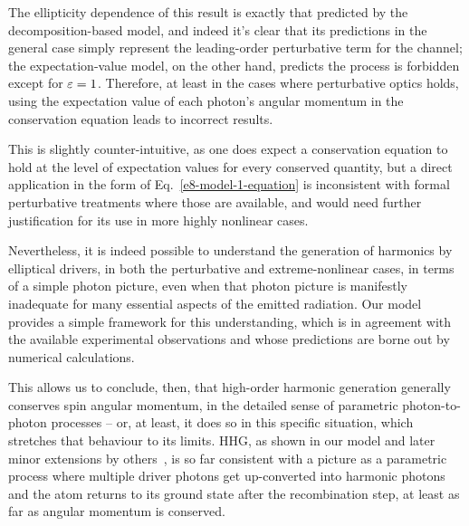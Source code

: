 The ellipticity dependence of this result is exactly that predicted by the decomposition-based model, and indeed it's clear that its predictions in the general case simply represent the leading-order perturbative term for the channel; the expectation-value model, on the other hand, predicts the process is forbidden except for $\varepsilon=1$. Therefore, at least in the cases where perturbative optics holds, using the expectation value of each photon's angular momentum in the conservation equation leads to incorrect results. 

This is slightly counter-intuitive, as one does expect a conservation equation to hold at the level of expectation values for every conserved quantity, but a direct application in the form of Eq.~\eqref{e8-model-1-equation} is inconsistent with formal perturbative treatments where those are available, and would need further justification for its use in more highly nonlinear cases.

Nevertheless, it is indeed possible to understand the generation of harmonics by elliptical drivers, in both the perturbative and extreme-nonlinear cases, in terms of a simple photon picture, even when that photon picture is manifestly inadequate for many essential aspects of the emitted radiation. Our model provides a simple framework for this understanding, which is in agreement with the available experimental observations and whose predictions are borne out by numerical calculations. 

This allows us to conclude, then, that high-order harmonic generation generally conserves spin angular momentum, in the detailed sense of parametric photon-to-photon processes -- or, at least, it does so in this specific situation, which stretches that behaviour to its limits. HHG, as shown in our model and later minor extensions by others~\cite{milosevic_bicircular-angular-momentum_2015}, is so far consistent with a picture as a parametric process where multiple driver photons get up-converted into harmonic photons and the atom returns to its ground state after the recombination step, at least as far as angular momentum is conserved.

































